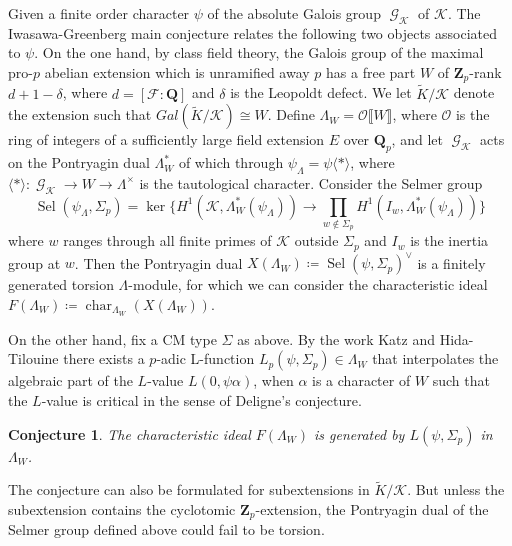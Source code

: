 \documentclass[leqno]{amsart}
\newtheorem*{conj}{Conjecture}
\theoremstyle{definition}
\theoremstyle{remark}
\newcommand{\oo}{\mathcal{O}}
\newcommand{\Q}{{\mathbf{Q}}}
\newcommand{\Qp}{\mathbf{Q}_p}
\newcommand{\Zp}{\mathbf{Z}_p}
\DeclareMathOperator{\Gal}{\mathcal{G}}
\newcommand{\F}{{\mathcal{F}}} %
\newcommand{\K}{{\mathcal{K}}} %
\DeclareMathOperator{\Sel}{Sel}
\DeclareMathOperator{\car}{char}
\begin{document}
Given a finite order character $\psi$
of the absolute Galois group $\Gal_\K$ of $\K$.
The Iwasawa-Greenberg main conjecture 
relates the following two objects associated to $\psi$.
On the one hand, 
by class field theory, the Galois group of
the maximal pro-$p$ abelian extension which is unramified 
away $p$ has a free part $W$ of $\Zp$-rank $d+1-\delta$,
where $d=[\F:\Q]$ and $\delta$ is the Leopoldt defect.
We let $\widetilde{K}/\K$ denote the extension such that 
$Gal(\widetilde{K}/\K)\cong W$.
Define $\Lambda_W=\oo\llbracket W\rrbracket$,
where $\oo$ is the ring of integers of a sufficiently large
field extension $E$ over $\Qp$,
and let $\Gal_\K$ acts on 
the Pontryagin dual $\Lambda_W^*$ of which through
$\psi_\Lambda=\psi\langle*\rangle$, where 
$\langle*\rangle\colon \Gal_\K\to W\to \Lambda^\times$
is the tautological character. 
Consider the Selmer group
\[
    \Sel(\psi_\Lambda,\Sigma_p)=\ker
    \big\{
    H^1(\K, \Lambda_W^*(\psi_\Lambda))\to \prod_{w\notin \Sigma_p}
    H^1(I_w, \Lambda_W^*(\psi_\Lambda))
    \big\}
\]
where $w$ ranges through all finite primes of $\K$
outside $\Sigma_p$
and $I_w$ is the inertia group at $w$.
Then the Pontryagin dual 
$X(\Lambda_W)\coloneqq \Sel(\psi,\Sigma_p)^\vee$
is a finitely generated torsion $\Lambda$-module,
for which we can consider the characteristic ideal
$F(\Lambda_W)\coloneqq \car_{\Lambda_W}(X(\Lambda_W))$.

On the other hand, fix a CM type $\Sigma$ as above.
By the work Katz \cite{Katz1978} 
and Hida-Tilouine \cite{HT93} there exists 
a $p$-adic L-function
$L_p(\psi,\Sigma_p)\in \Lambda_W$ 
that interpolates the algebraic part
of the $L$-value $L(0,\psi\alpha)$,
when $\alpha$ is a character of $W$ such that
the $L$-value is critical in the sense of Deligne's conjecture.

\begin{conj}
The characteristic ideal $F(\Lambda_W)$
is generated by $L(\psi,\Sigma_p)$ in $\Lambda_W$.
\end{conj}


The conjecture can also be formulated for
subextensions in $\widetilde{K}/\K$.
But unless the subextension contains the 
cyclotomic $\Zp$-extension,
the Pontryagin dual of the Selmer group defined above
could fail to be torsion.
\end{document}
